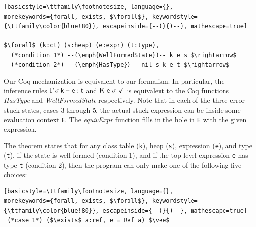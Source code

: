 \documentclass[a4paper,USenglish]{tex/lipics-v2016}
\begin{document}
\begin{lstlisting}[basicstyle=\ttfamily\footnotesize, language={}, 
morekeywords={forall, exists, $\forall$}, keywordstyle={\ttfamily\color{blue!80}}, escapeinside={--(}{)--}, mathescape=true]

$\forall$ (k:ct) (s:heap) (e:expr) (t:type),
  (*condition 1*) --(\emph{WellFormedState})-- k e s $\rightarrow$ 
  (*condition 2*) --(\emph{HasType})-- nil s k e t $\rightarrow$ 
\end{lstlisting}

Our Coq mechanization is equivalent to our formalism. In particular, the
inference rules $\EnvType\Env\s\k\e\t$ and $\WFq{\K~\e~\s}$ is equivalent to
the Coq functions \emph{HasType} and \emph{WellFormedState} respectively.
Note that in each of the three error stuck states, cases 3 through 5, the
actual stuck expression can be inside some evaluation context \verb|E|. The
\emph{equivExpr} function fills in the hole in \verb|E| with the given
expression.

The theorem states that for any class table (\verb|k|), heap (\verb|s|),
expression (\verb|e|), and type (\verb|t|), if the state is well formed
(condition 1), and if the top-level expression \verb|e| has type \verb|t|
(condition 2), then the program can only make one of the following five
choices:

\begin{lstlisting}[basicstyle=\ttfamily\footnotesize, language={}, 
morekeywords={forall, exists, $\forall$}, keywordstyle={\ttfamily\color{blue!80}}, escapeinside={--(}{)--}, mathescape=true]  
 (*case 1*) ($\exists$ a:ref, e = Ref a) $\vee$
\end{lstlisting}
\end{document}
